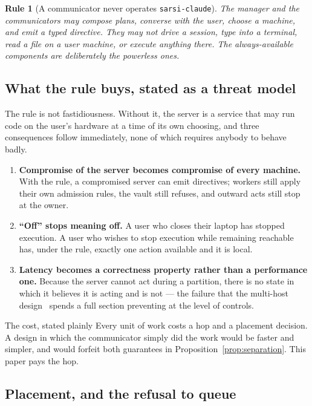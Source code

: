 \documentclass[11pt]{article}
\newtheorem{drule}{Rule}
\newcommand{\code}[1]{\texttt{\small #1}}
\begin{document}
\begin{drule}[A communicator never operates \code{sarsi-claude}]
\label{rule:nocom}
The manager and the communicators may compose plans, converse with the user, choose a machine, and emit a typed directive. They may not drive a session, type into a terminal, read a file on a user machine, or execute anything there. The always-available components are deliberately the powerless ones.
\end{drule}

\subsection{What the rule buys, stated as a threat model}

The rule is not fastidiousness. Without it, the server is a service that may run code on the user's hardware at a time of its own choosing, and three consequences follow immediately, none of which requires anybody to behave badly.

\begin{enumerate}
\item \textbf{Compromise of the server becomes compromise of every machine.} With the rule, a compromised server can emit directives; workers still apply their own admission rules, the vault still refuses, and outward acts still stop at the owner.
\item \textbf{``Off'' stops meaning off.} A user who closes their laptop has stopped execution. A user who wishes to stop execution while remaining reachable has, under the rule, exactly one action available and it is local.
\item \textbf{Latency becomes a correctness property rather than a performance one.} Because the server cannot act during a partition, there is no state in which it believes it is acting and is not --- the failure that the multi-host design~\citep{yang2026account} spends a full section preventing at the level of controls.
\end{enumerate}

\begin{cautionbox}{The cost, stated plainly}
Every unit of work costs a hop and a placement decision. A design in which the communicator simply did the work would be faster and simpler, and would forfeit both guarantees in Proposition~\ref{prop:separation}. This paper pays the hop.
\end{cautionbox}

\subsection{Placement, and the refusal to queue}
\end{document}
